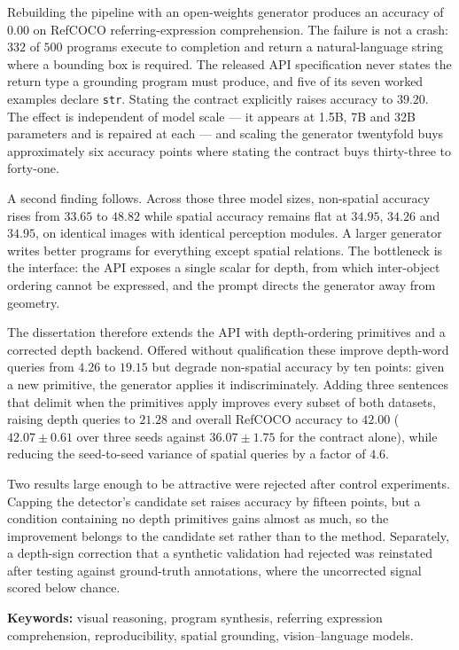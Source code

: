 \documentclass[12pt,a4paper,oneside]{report}
\begin{document}
Rebuilding the pipeline with an open-weights generator produces an accuracy of
$0.00$ on RefCOCO referring-expression comprehension. The failure is not a crash:
$332$ of $500$ programs execute to completion and return a natural-language string
where a bounding box is required. The released API specification never states the
return type a grounding program must produce, and five of its seven worked examples
declare \texttt{str}. Stating the contract explicitly raises accuracy to $39.20$.
The effect is independent of model scale --- it appears at 1.5B, 7B and 32B
parameters and is repaired at each --- and scaling the generator twentyfold buys
approximately six accuracy points where stating the contract buys thirty-three to
forty-one.

A second finding follows. Across those three model sizes, non-spatial accuracy rises
from $33.65$ to $48.82$ while spatial accuracy remains flat at $34.95$, $34.26$ and
$34.95$, on identical images with identical perception modules. A larger generator
writes better programs for everything except spatial relations. The bottleneck is the
interface: the API exposes a single scalar for depth, from which inter-object
ordering cannot be expressed, and the prompt directs the generator away from geometry.

The dissertation therefore extends the API with depth-ordering primitives and a
corrected depth backend. Offered without qualification these improve depth-word
queries from $4.26$ to $19.15$ but degrade non-spatial accuracy by ten points: given
a new primitive, the generator applies it indiscriminately. Adding three sentences
that delimit when the primitives apply improves every subset of both datasets,
raising depth queries to $21.28$ and overall RefCOCO accuracy to $42.00$
($42.07 \pm 0.61$ over three seeds against $36.07 \pm 1.75$ for the contract alone),
while reducing the seed-to-seed variance of spatial queries by a factor of $4.6$.

Two results large enough to be attractive were rejected after control experiments.
Capping the detector's candidate set raises accuracy by fifteen points, but a
condition containing no depth primitives gains almost as much, so the improvement
belongs to the candidate set rather than to the method. Separately, a depth-sign
correction that a synthetic validation had rejected was reinstated after testing
against ground-truth annotations, where the uncorrected signal scored below chance.

\vspace{1em}
\noindent\textbf{Keywords:} visual reasoning, program synthesis, referring expression
comprehension, reproducibility, spatial grounding, vision--language models.
\end{document}
